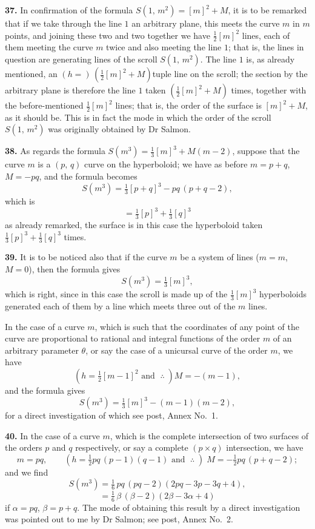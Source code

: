 \documentclass[11pt,a4paper]{article}
\begin{document}
\medskip

\textbf{37.} In confirmation of the formula $S(1,\,m^2) = [m]^2 + M$, it is to be remarked that if we take through the line $1$ an arbitrary plane, this meets the curve $m$ in $m$ points, and joining these two and two together we have $\tfrac{1}{2}[m]^2$ lines, each of them meeting the curve $m$ twice and also meeting the line $1$; that is, the lines in question are generating lines of the scroll $S(1,\,m^2)$. The line $1$ is, as already mentioned, an $(h=)\,(\tfrac{1}{2}[m]^2 + M)$tuple line on the scroll; the section by the arbitrary plane is therefore the line $1$ taken $(\tfrac{1}{2}[m]^2 + M)$ times, together with the before-mentioned $\tfrac{1}{2}[m]^2$ lines; that is, the order of the surface is $[m]^2 + M$, as it should be. This is in fact the mode in which the order of the scroll $S(1,\,m^2)$ was originally obtained by Dr Salmon.

\medskip

\textbf{38.} As regards the formula $S(m^3) = \tfrac{1}{3}[m]^3 + M(m-2)$, suppose that the curve $m$ is a $(p,\,q)$ curve on the hyperboloid; we have as before $m = p+q$, $M = -pq$, and the formula becomes
\[
S(m^3) = \tfrac{1}{3}[p+q]^3 - pq\,(p+q-2),
\]
which is
\[
= \tfrac{1}{3}[p]^3 + \tfrac{1}{3}[q]^3
\]
as already remarked, the surface is in this case the hyperboloid taken $\tfrac{1}{3}[p]^3 + \tfrac{1}{3}[q]^3$ times.

\medskip

\textbf{39.} It is to be noticed also that if the curve $m$ be a system of lines ($m=m$, $M=0$), then the formula gives
\[
S(m^3) = \tfrac{1}{3}[m]^3,
\]
which is right, since in this case the scroll is made up of the $\tfrac{1}{3}[m]^3$ hyperboloids generated each of them by a line which meets three out of the $m$ lines.

\medskip

In the case of a curve $m$, which is such that the coordinates of any point of the curve are proportional to rational and integral functions of the order $m$ of an arbitrary parameter $\theta$, or say the case of a unicursal curve of the order $m$, we have
\[
(h = \tfrac{1}{2}[m-1]^2 \text{ and }\;\therefore\;) M = -(m-1),
\]
and the formula gives
\[
S(m^3) = \tfrac{1}{3}[m]^3 - (m-1)(m-2),
\]
for a direct investigation of which see post, Annex No.~1.

\medskip

\textbf{40.} In the case of a curve $m$, which is the complete intersection of two surfaces of the orders $p$ and $q$ respectively, or say a complete $(p \times q)$ intersection, we have
\[
m = pq,\qquad (h = \tfrac{1}{2}pq\,(p-1)(q-1) \text{ and }\;\therefore\;)\; M = -\tfrac{1}{2}pq\,(p+q-2);
\]
and we find
\[
S(m^3) = \tfrac{1}{6}\,pq\,(pq-2)(2pq - 3p - 3q + 4),
\]
\[
= \tfrac{1}{6}\,\beta\,(\beta - 2)(2\beta - 3\alpha + 4)
\]
if $\alpha = pq$, $\beta = p + q$. The mode of obtaining this result by a direct investigation was pointed out to me by Dr Salmon; see post, Annex No.~2.
\end{document}
